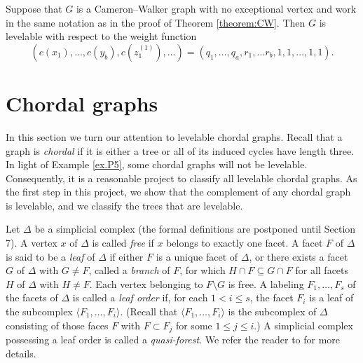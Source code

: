 \documentclass[12pt]{amsart}
\numberwithin{equation}{section}
\theoremstyle{definition}
\newcounter{i} %
\begin{document}
Suppose that $G$ is a Cameron--Walker graph with no exceptional vertex and work in the same notation as in the proof of Theorem \ref{theorem:CW}.  Then $G$ is levelable with respect to the weight function 
\[
(c(x_1), \ldots, c(y_b), c(z^{(1)}_1), \ldots) =(q_1, \ldots, q_a, r_1, \ldots r_b, 1, 1, \ldots, 1,1).
\]





\section{Chordal graphs}

In this section we turn our attention
to levelable chordal graphs.  Recall that a graph
is {\it chordal} if it is either a tree or all of its 
induced cycles have length three.   
In light of Example \ref{ex.P5}, some 
chordal graphs will not be levelable. Consequently, it is a reasonable project to classify all levelable chordal graphs.
As the first step in this project, we show that
the complement of any chordal graph is levelable, and
we classify the trees that are levelable.

Let $\Delta$ be a simplicial complex (the formal definitions are postponed until
Section 7). A vertex $x$ of $\Delta$ is called {\it free} if $x$ belongs to exactly one facet.  A facet $F$ of $\Delta$ is said to be a {\it leaf} of $\Delta$ if either 
$F$ is a unique facet of $\Delta$, or there exists a facet $G$ of $\Delta$ with $G \neq F$, called a {\it branch} of $F$, for which $H \cap F \subseteq G \cap F$ for all facets $H$ of $\Delta$ with $H \neq F$.  Each vertex belonging to $F \setminus G$ is free.  A labeling $F_1, \ldots, F_s$ of the facets of $\Delta$ is called a {\it leaf order} if, for each $1 < i \leq s$, the facet $F_i$ is a leaf of the subcomplex $\langle F_1, \ldots, F_{i}\rangle$.  (Recall that $\langle F_1, \ldots, F_{i}\rangle$ is the subcomplex of $\Delta$ consisting of those faces $F$ with $F \subset F_j$ for some $1 \leq j \leq i$.)  A simplicial complex possessing a leaf order is called a {\it quasi-forest}.  We refer the reader to \cite[Chapter 9]{HHgtm260} for more details.
\end{document}
